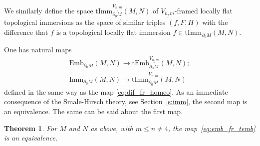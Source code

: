 \documentclass[11pt]{amsart}
\newtheorem{theorem}{Theorem}[section]
\theoremstyle{definition}
\newcommand{\Emb}{\mathrm{Emb}}
\newcommand{\Imm}{\mathrm{Imm}}
\newcommand{\tImm}{\mathrm{tImm}}
\newcommand{\tEmb}{\mathrm{tEmb}}
\newcommand{\hofiber}{\mathrm{hofiber}}
\newcommand{\fiber}{\mathrm{fiber}}
\numberwithin{equation}{section}
\begin{document}
We similarly define the space $\tImm_{\partial_0M}^{\underline{V_{n,m}}}(M,N)$ of $\underline{V_{n,m}}$-framed locally flat topological immersions as the space of similar triples
$(f,F,H)$ with the difference that $f$ is a topological locally flat immersion $f\in \tImm_{\partial_0M}(M,N)$.

One has natural maps 
\begin{gather}
 \Emb_{\partial_0M}(M,N)\to
 \tEmb_{\partial_0M}^{\underline{V_{n,m}}}(M,N); \label{eq:emb_fr_temb}\\
 \Imm_{\partial_0M}(M,N)\to
 \tImm_{\partial_0M}^{\underline{V_{n,m}}}(M,N) \label{eq:imm_fr_imm}
\end{gather}
defined in the same way as the map \eqref{eq:dif_fr_homeo}.  As an immediate consequence of the Smale-Hirsch theory, see Section~\ref{s:imm}, 
the second map is an equivalence. 
 The same can be said about the first map.

\begin{theorem}\label{th:emb_fr_temb}
For $M$ and $N$ as above, with $m\leq n\neq 4$, the map~\eqref{eq:emb_fr_temb} is an equivalence.
\end{theorem}
\end{document}

